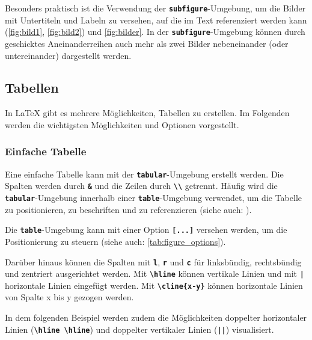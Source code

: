 Besonders praktisch ist die Verwendung der \textbf{\texttt{subfigure}}-Umgebung, um die Bilder mit Untertiteln und Labeln zu versehen, auf die im Text referenziert werden kann (\autoref{fig:bild1}, \autoref{fig:bild2}) und \autoref{fig:bilder}.
In der \textbf{\texttt{subfigure}}-Umgebung können durch geschicktes Aneinanderreihen auch mehr als zwei Bilder nebeneinander (oder untereinander) dargestellt werden.


\subsection{Tabellen}
In \LaTeX{} gibt es mehrere Möglichkeiten, Tabellen zu erstellen. Im Folgenden werden die wichtigsten Möglichkeiten und Optionen vorgestellt.

\subsubsection{Einfache Tabelle}
Eine einfache Tabelle kann mit der \textbf{\texttt{tabular}}-Umgebung erstellt werden. Die Spalten werden durch \textbf{\texttt{\&}} und die Zeilen durch \textbf{\texttt{\textbackslash\textbackslash}} getrennt. Häufig wird die \textbf{\texttt{tabular}}-Umgebung innerhalb einer \textbf{\texttt{table}}-Umgebung verwendet, um die Tabelle zu positionieren, zu beschriften und zu referenzieren (siehe auch: ).

Die \textbf{\texttt{table}}-Umgebung kann mit einer Option \textbf{\texttt{[...]}} versehen werden, um die Positionierung zu steuern (siehe auch: \autoref{tab:figure_options}).

Darüber hinaus können die Spalten mit \textbf{\texttt{l}}, \textbf{\texttt{r}} und \textbf{\texttt{c}} für linksbündig, rechtsbündig und zentriert ausgerichtet werden. Mit \textbf{\texttt{\textbackslash hline}} können vertikale Linien und mit \textbf{\texttt{|}} horizontale Linien eingefügt werden.
Mit \textbf{\texttt{\textbackslash cline\{x-y\}}} können horizontale Linien von Spalte x bis y gezogen werden.

In dem folgenden Beispiel werden zudem die Möglichkeiten doppelter horizontaler Linien (\textbf{\texttt{\textbackslash hline \textbackslash hline}}) und doppelter vertikaler Linien (\textbf{\texttt{||}}) visualisiert.

